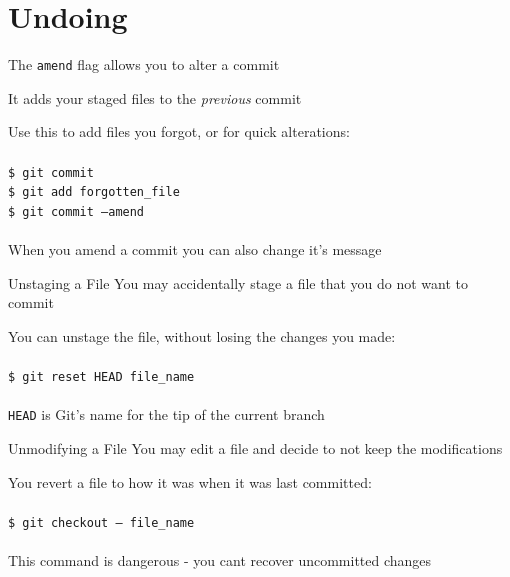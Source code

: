 \documentclass{beamer}
\begin{document}
\section{Undoing}
\begin{frame}{\secname}
    The {\tt amend} flag allows you to alter a commit

    It adds your staged files to the {\it previous} commit 

    Use this to add files you forgot, or for quick alterations:\\~\\
    {\tt \$ git commit\\
    \$ git add forgotten\_file\\
    \$ git commit --amend} \\~\\

    When you amend a commit you can also change it's message
\end{frame}

\begin{frame}{Unstaging a File}
    You may accidentally stage a file that you do not want to commit

    You can unstage the file, without losing the changes you made:\\~\\
    {\tt \$ git reset HEAD file\_name} \\~\\
    {\tt HEAD} is Git's name for the tip of the current branch   
\end{frame}

\begin{frame}{Unmodifying a File}
    You may edit a file and decide to not keep the modifications

    You revert a file to how it was when it was last committed: \\~\\
    
    {\tt \$ git checkout -- file\_name} \\~\\

    This command is dangerous - you cant recover uncommitted changes
\end{frame}
\end{document}
